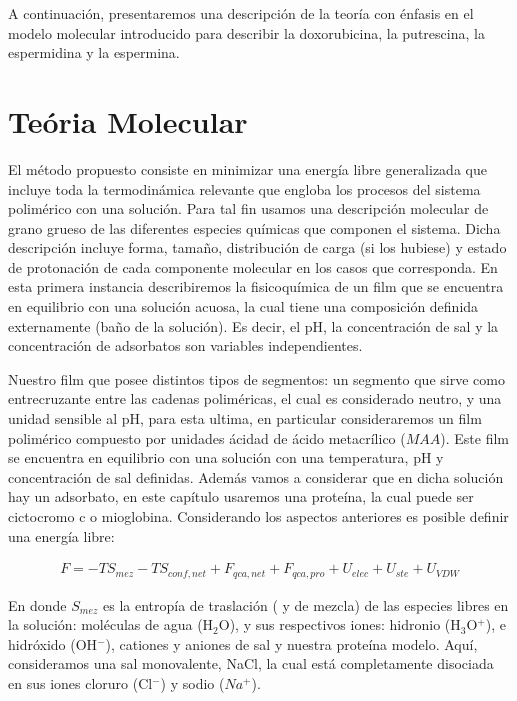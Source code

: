 A continuaci\'on, presentaremos una descripci\'on de la teor\'ia con \'enfasis en el modelo molecular introducido para describir la doxorubicina, la putrescina, la espermidina y la espermina.


\section{Te\'oria Molecular } \label{sec:film-teoria}

El m\'etodo propuesto consiste en minimizar una energ\'ia libre generalizada que incluye toda la termodin\'amica relevante que engloba los procesos del sistema polim\'erico con una soluci\'on.
Para tal fin  usamos  una descripci\'on molecular de grano grueso de las diferentes especies qu\'imicas que componen el sistema.
Dicha descripci\'on incluye forma, tama\~no, distribuci\'on de carga (si los hubiese) y estado de protonaci\'on de cada componente molecular en los casos que corresponda.
En esta primera instancia describiremos la fisicoqu\'imica de un film  que  se encuentra en  equilibrio con una soluci\'on acuosa, la cual  tiene una composici\'on  definida externamente (ba\~no de la soluci\'on).
Es decir, el pH, la concentración de sal y la concentraci\'on de adsorbatos son variables independientes.


Nuestro film que posee distintos tipos de segmentos: un segmento que sirve como entrecruzante entre las cadenas polim\'ericas, el cual es considerado neutro, y  una unidad sensible al pH,  para esta ultima, en particular consideraremos un film polim\'erico compuesto por unidades \'acidad de \'acido metacr\'ilico ($MAA$).
Este film  se encuentra en equilibrio con una soluci\'on con una temperatura, pH y concentraci\'on de sal definidas. Adem\'as vamos a considerar que en dicha soluci\'on hay un adsorbato, en este cap\'itulo usaremos una prote\'ina, la cual puede ser cictocromo c o mioglobina. 
Considerando los aspectos anteriores es posible definir una energ\'ia libre:

\begin{align}
 	F = -TS_{mez} -TS_{conf,net} + F_{qca,net} + F_{qca,pro} + U_{elec} + U_{ste} + U_{VDW}
 	\label{eq:film:libre-film}
\end{align}
 
\noindent En donde $S_{mez}$ es la entrop\'ia de traslaci\'on ( y de mezcla) de las especies libres en la soluci\'on: mol\'eculas de agua (H$_2$O), y sus respectivos iones:  hidronio (H$_3$O$^+$), e hidr\'oxido (OH$^- $), cationes y aniones de sal y nuestra prote\'ina modelo.
Aqu\'i, consideramos una sal monovalente, NaCl, la cual est\'a completamente disociada en sus  iones cloruro (Cl$^-$) y sodio ($Na^+$). 

